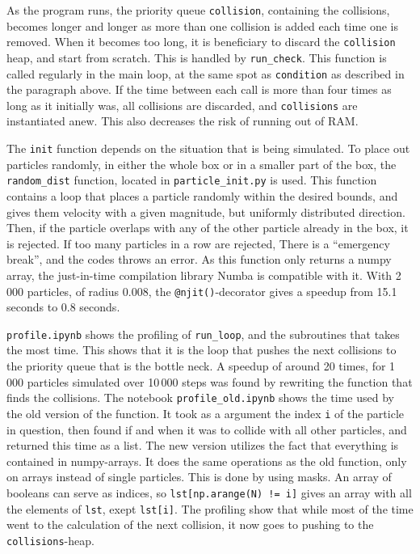 \documentclass{article}
\begin{document}
    As the program runs, the priority queue \verb|collision|, containing the collisions, becomes longer and longer as more than one collision is added each time one is removed.
    When it becomes too long, it is beneficiary to discard the \verb|collision| heap, and start from scratch.
    This is handled by \verb|run_check|.
    This function is called regularly in the main loop, at the same spot as \verb|condition| as described in the paragraph above.
    If the time between each call is more than four times as long as it initially was, all collisions are discarded, and \verb|collisions| are instantiated anew.
    This also decreases the risk of running out of RAM.

    The \verb|init| function depends on the situation that is being simulated.
    To place out particles randomly, in either the whole box or in a smaller part of the box, the \verb|random_dist| function, located in \verb|particle_init.py| is used.
    This function contains a loop that places a particle randomly within the desired bounds, and gives them velocity with a given magnitude, but uniformly distributed direction.
    Then, if the particle overlaps with any of the other particle already in the box, it is rejected.
    If too many particles in a row are rejected, There is a ``emergency break'', and the codes throws an error.
    As this function only returns a numpy array, the just-in-time compilation library Numba is compatible with it.
    With 2\,000 particles, of radius 0.008, the \verb|@njit()|-decorator gives a speedup from 15.1 seconds to 0.8 seconds.

    \verb|profile.ipynb| shows the profiling of \verb|run_loop|, and the subroutines that takes the most time.
    This shows that it is the loop that pushes the next collisions to the priority queue that is the bottle neck.
    A speedup of around 20 times, for 1\,000 particles simulated over 10\,000 steps was found by rewriting the function that finds the collisions.
    The notebook \verb|profile_old.ipynb| shows the time used by the old version of the function. It took as a argument the index \verb|i| of the particle in question, then found if and when it was to collide with all other particles, and returned this time as a list.
    The new version utilizes the fact that everything is contained in numpy-arrays.
    It does the same operations as the old function, only on arrays instead of single particles.
    This is done by using masks.
    An array of booleans can serve as indices, so \verb|lst[np.arange(N) != i]| gives an array with all the elements of \verb|lst|, exept \verb|lst[i]|.
    The profiling show that while most of the time went to the calculation of the next collision, it now goes to pushing to the \verb|collisions|-heap.
\end{document}

